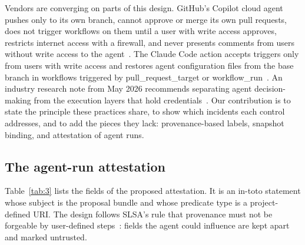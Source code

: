 \documentclass[acmsmall,screen,review]{acmart}
\begin{document}
Vendors are converging on parts of this design. GitHub's Copilot cloud agent pushes only to its own branch, cannot approve or merge its own pull requests, does not trigger workflows on them until a user with write access approves, restricts internet access with a firewall, and never presents comments from users without write access to the agent~\cite{githubndrisks}. The Claude Code action accepts triggers only from users with write access and restores agent configuration files from the base branch in workflows triggered by pull\_request\_target or workflow\_run~\cite{anthropicndsecurity}. An industry research note from May 2026 recommends separating agent decision-making from the execution layers that hold credentials~\cite{cloud2026prompt}. Our contribution is to state the principle these practices share, to show which incidents each control addresses, and to add the pieces they lack: provenance-based labels, snapshot binding, and attestation of agent runs.


\subsection{The agent-run attestation}\label{sec:7.3}

Table~\ref{tab:3} lists the fields of the proposed attestation. It is an in-toto statement whose subject is the proposal bundle and whose predicate type is a project-defined URI. The design follows SLSA's rule that provenance must not be forgeable by user-defined steps~\cite{openndslsa}: fields the agent could influence are kept apart and marked untrusted.
\end{document}
